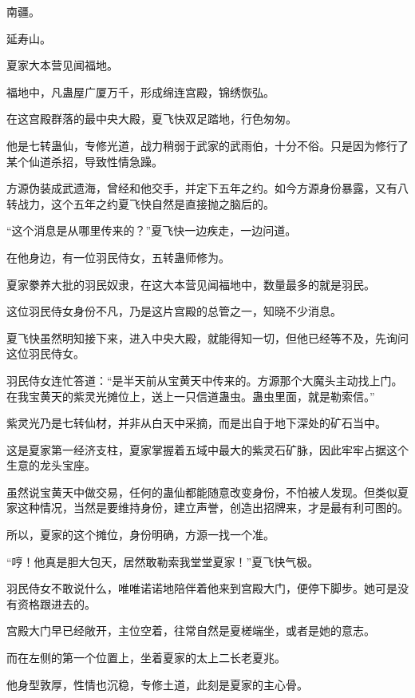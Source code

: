
\begin{this_body}

南疆。

延寿山。

夏家大本营见闻福地。

福地中，凡蛊屋广厦万千，形成绵连宫殿，锦绣恢弘。

在这宫殿群落的最中央大殿，夏飞快双足踏地，行色匆匆。

他是七转蛊仙，专修光道，战力稍弱于武家的武雨伯，十分不俗。只是因为修行了某个仙道杀招，导致性情急躁。

方源伪装成武遗海，曾经和他交手，并定下五年之约。如今方源身份暴露，又有八转战力，这个五年之约夏飞快自然是直接抛之脑后的。

“这个消息是从哪里传来的？”夏飞快一边疾走，一边问道。

在他身边，有一位羽民侍女，五转蛊师修为。

夏家豢养大批的羽民奴隶，在这大本营见闻福地中，数量最多的就是羽民。

这位羽民侍女身份不凡，乃是这片宫殿的总管之一，知晓不少消息。

夏飞快虽然明知接下来，进入中央大殿，就能得知一切，但他已经等不及，先询问这位羽民侍女。

羽民侍女连忙答道：“是半天前从宝黄天中传来的。方源那个大魔头主动找上门。在我宝黄天的紫灵光摊位上，送上一只信道蛊虫。蛊虫里面，就是勒索信。”

紫灵光乃是七转仙材，并非从白天中采摘，而是出自于地下深处的矿石当中。

这是夏家第一经济支柱，夏家掌握着五域中最大的紫灵石矿脉，因此牢牢占据这个生意的龙头宝座。

虽然说宝黄天中做交易，任何的蛊仙都能随意改变身份，不怕被人发现。但类似夏家这种情况，当然是要维持身份，建立声誉，创造出招牌来，才是最有利可图的。

所以，夏家的这个摊位，身份明确，方源一找一个准。

“哼！他真是胆大包天，居然敢勒索我堂堂夏家！”夏飞快气极。

羽民侍女不敢说什么，唯唯诺诺地陪伴着他来到宫殿大门，便停下脚步。她可是没有资格跟进去的。

宫殿大门早已经敞开，主位空着，往常自然是夏槎端坐，或者是她的意志。

而在左侧的第一个位置上，坐着夏家的太上二长老夏兆。

他身型敦厚，性情也沉稳，专修土道，此刻是夏家的主心骨。


\end{this_body}
